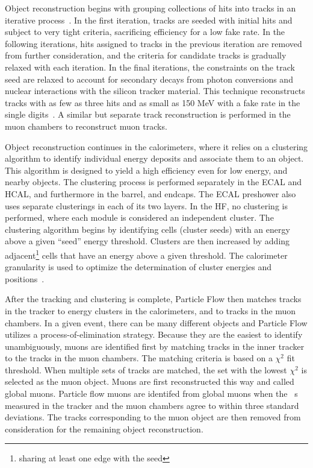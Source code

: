 Object reconstruction begins with grouping collections of hits into tracks in an iterative process~\cite{CMS-TRK-09-001}. In the first iteration, tracks are
seeded with initial hits and subject to very tight criteria, sacrificing efficiency for a low fake rate. In the following iterations, hits assigned to
tracks in the previous iteration are removed from further consideration, and the criteria for candidate tracks is gradually relaxed with each iteration. In the final iterations,
the constraints on the track seed are relaxed to account for secondary decays from photon conversions and nuclear interactions with the silicon tracker material. This technique
reconstructs tracks with as few as three hits and \pts as small as 150 MeV with a fake rate in the single digits~\cite{CMS-PFT-09-001}. A similar but separate track
reconstruction is performed in the muon chambers to reconstruct muon tracks. 

Object reconstruction continues in the calorimeters, where it relies on a clustering algorithm to identify individual energy deposits and associate them to an object. This
algorithm is designed to yield a high efficiency even for low energy, and nearby objects. The clustering process is performed separately in the ECAL and HCAL, and furthermore in
the barrel, and endcaps. The ECAL preshower also uses separate clusterings in each of its two layers. In the HF, no clustering is performed, where each module is considered an
independent cluster. The clustering algorithm begins by identifying cells (cluster seeds) with an energy above a given ``seed'' energy threshold. Clusters are then increased by
adding adjacent\footnote{sharing at least one edge with the seed} cells that have an energy above a given threshold. The calorimeter granularity is used to optimize the
determination of cluster energies and positions~\cite{CMS-PFT-09-001}.  

After the tracking and clustering is complete, Particle Flow then matches tracks in the tracker to energy clusters in the calorimeters, and to tracks in the muon chambers.
In a given event, there can be many different objects and Particle Flow utilizes
a process-of-elimination strategy. Because they are the easiest to identify unambiguously, muons are identified first by matching tracks in the inner tracker to the tracks in
the muon chambers. The matching criteria is based on a $\chi^{2}$ fit threshold. When multiple sets of tracks are matched, the set with the lowest $\chi^{2}$ is selected as the
muon object. Muons are first reconstructed this way and called global muons. Particle flow muons are identifed from global muons when the \pt~s measured in the tracker and the
muon chambers agree to within three standard deviations. The tracks corresponding to the muon object are then removed from consideration for the remaining object reconstruction. 

